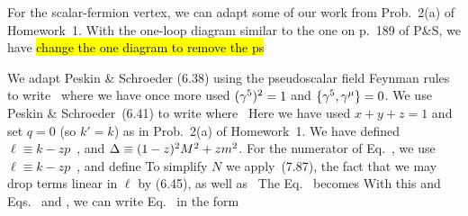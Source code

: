 \documentclass[11pt]{article}
\begin{document}
{	For the scalar-fermion vertex, we can adapt some of our work from Prob.~2(a) of Homework~1.  With the one-loop diagram similar to the one on p.~189 of P\&S, we have
	\hl{change the one diagram to remove the ps}
	
	We adapt Peskin \& Schroeder (6.38) using the pseudoscalar field Feynman rules to write~\cite[p.~123]{Peskin}
	where we have once more used $(\gamma^5)^2 = 1$ and $\{ \gamma^5, \gamma^\mu \} = 0$.  We use Peskin \& Schroeder~(6.41) to write 
	where~\cite[pp.~190--191]{Peskin}
	Here we have used $x + y + z = 1$ and set $q = 0$ (so $k' = k$) as in Prob.~2(a) of Homework~1.  We have defined $\ell \equiv k - z p$~\cite[p.~191]{Peskin}, and $\Delta \equiv (1 - z)^2 M^2 + z m^2$.  For the numerator of Eq.~, we use $\ell \equiv k - z p$~\cite[p.~191]{Peskin}, and define
	To simplify $N$ we apply~(7.87),
	the fact that we may drop terms linear in $\ell$ by (6.45),
	as well as~\cite[pp.~191--192]{Peskin}
	The Eq.~ becomes
	With this and Eqs.~ and , we can write Eq.~ in the form
}
\end{document}
